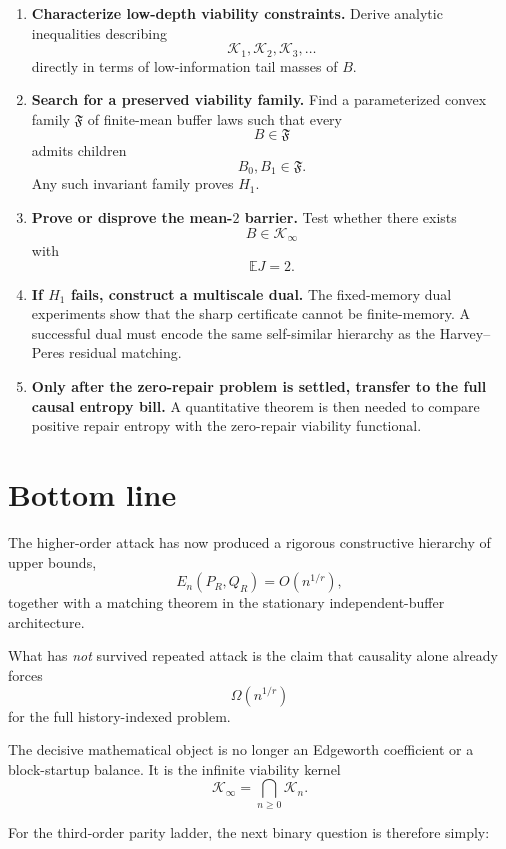 \documentclass[11pt,a4paper]{article}
\newcommand{\E}{\mathbb E}
\newcommand{\cK}{\mathcal K}
\begin{document}
\begin{enumerate}[label=\textbf{T\arabic*.}]
\item
\textbf{Characterize low-depth viability constraints.}
Derive analytic inequalities describing
\[
\cK_1,\cK_2,\cK_3,\ldots
\]
directly in terms of low-information tail masses of \(B\).

\item
\textbf{Search for a preserved viability family.}
Find a parameterized convex family \(\mathfrak F\) of finite-mean buffer laws
such that every
\[
B\in\mathfrak F
\]
admits children
\[
B_0,B_1\in\mathfrak F.
\]
Any such invariant family proves \(H_1\).

\item
\textbf{Prove or disprove the mean-\(2\) barrier.}
Test whether there exists
\[
B\in\cK_\infty
\]
with
\[
\E J=2.
\]

\item
\textbf{If \(H_1\) fails, construct a multiscale dual.}
The fixed-memory dual experiments show that the sharp certificate cannot be
finite-memory.  A successful dual must encode the same self-similar
hierarchy as the Harvey--Peres residual matching.

\item
\textbf{Only after the zero-repair problem is settled, transfer to the full
causal entropy bill.}
A quantitative theorem is then needed to compare positive repair entropy
with the zero-repair viability functional.
\end{enumerate}

\section{Bottom line}

The higher-order attack has now produced a rigorous constructive hierarchy
of upper bounds,
\[
\boxed{
E_n(P_R,Q_R)=O(n^{1/r}),
}
\]
together with a matching theorem in the stationary independent-buffer
architecture.

What has \emph{not} survived repeated attack is the claim that causality
alone already forces
\[
\Omega(n^{1/r})
\]
for the full history-indexed problem.

The decisive mathematical object is no longer an Edgeworth coefficient or
a block-startup balance.  It is the infinite viability kernel
\[
\boxed{
\cK_\infty
=
\bigcap_{n\ge0}\cK_n.
}
\]

For the third-order parity ladder, the next binary question is therefore
simply:
\end{document}
